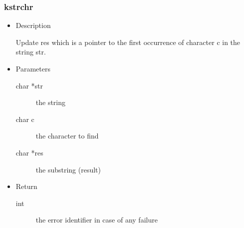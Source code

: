\subsubsection{kstrchr}
\begin{itemize}
\item{Description}

	Update res which is a pointer to the first occurrence of character c in the string str.
\item{Parameters}
	\begin{description}
	\item[char *str] the string
	\item[char c] the character to find
	\item[char *res] the substring (result)
	\end{description}
\item{Return}
	\begin{description}
	\item[int] the error identifier in case of any failure
	\end{description}
\end{itemize}
